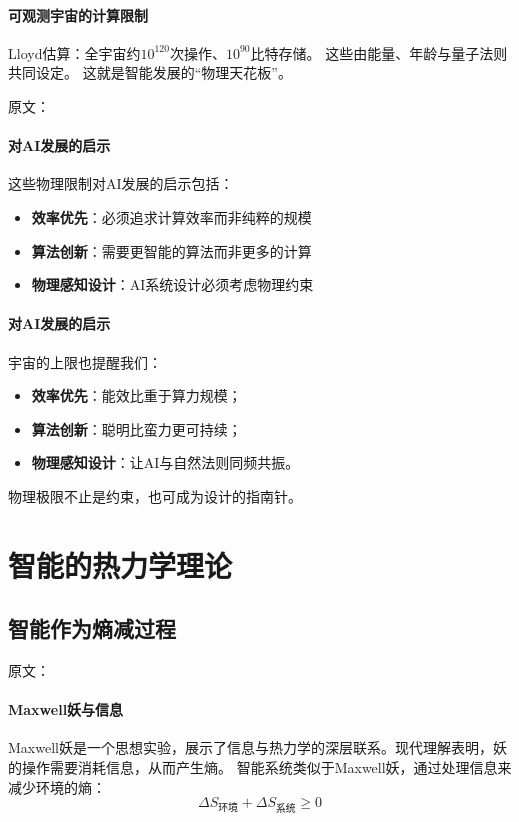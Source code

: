 \paragraph{可观测宇宙的计算限制}
Lloyd估算：全宇宙约$10^{120}$次操作、$10^{90}$比特存储。  
这些由能量、年龄与量子法则共同设定。  
这就是智能发展的“物理天花板”。

原文：
\paragraph{对AI发展的启示}
这些物理限制对AI发展的启示包括：
\begin{itemize}
\item \textbf{效率优先}：必须追求计算效率而非纯粹的规模
\item \textbf{算法创新}：需要更智能的算法而非更多的计算
\item \textbf{物理感知设计}：AI系统设计必须考虑物理约束
\end{itemize}
\paragraph{对AI发展的启示}
宇宙的上限也提醒我们：
\begin{itemize}
\item \textbf{效率优先}：能效比重于算力规模；
\item \textbf{算法创新}：聪明比蛮力更可持续；
\item \textbf{物理感知设计}：让AI与自然法则同频共振。
\end{itemize}
物理极限不止是约束，也可成为设计的指南针。



\section{智能的热力学理论}

\subsection{智能作为熵减过程}

原文：
\paragraph{Maxwell妖与信息}
Maxwell妖是一个思想实验，展示了信息与热力学的深层联系。现代理解表明，妖的操作需要消耗信息，从而产生熵。
智能系统类似于Maxwell妖，通过处理信息来减少环境的熵：
$$\Delta S_{\text{环境}} + \Delta S_{\text{系统}} \geq 0$$
